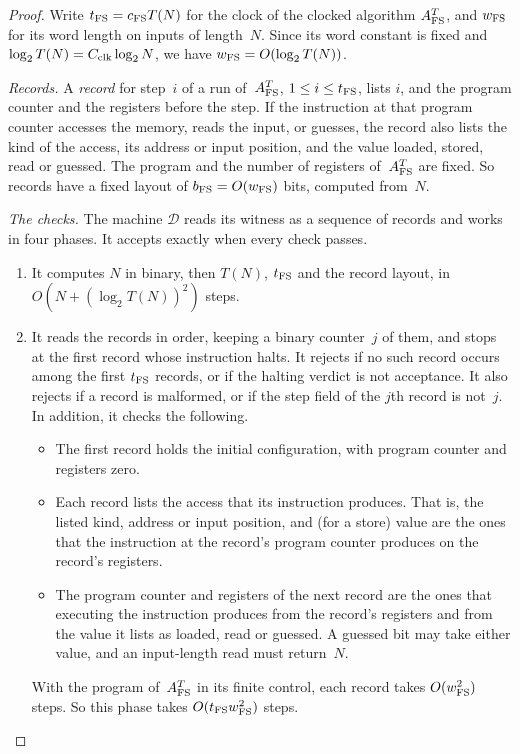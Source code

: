 \documentclass[11pt,letterpaper]{article}
\theoremstyle{definition}
\theoremstyle{remark}
\begin{document}
\begin{proof}
Write $t_{\rm FS}=c_{\rm FS}T(N)$ for the clock of the clocked algorithm
$A^T_{\rm FS}$, and $w_{\rm FS}$ for its word length on inputs of
length~$N$. Since its word constant is fixed and
$\log_2T(N)=C_{\rm clk}\log_2N$, we have $w_{\rm FS}=O(\log_2T(N))$.

\emph{Records.} A \emph{record} for step~$i$ of a run
of~$A^T_{\rm FS}$, $1\le i\le t_{\rm FS}$, lists $i$, and the program
counter and the registers before the step. If the instruction at that
program counter accesses the memory, reads the input, or guesses, the
record also lists the kind of the access, its address or input position,
and the value loaded, stored, read or guessed. The program and the
number of registers of~$A^T_{\rm FS}$ are fixed. So records have a fixed
layout of $b_{\rm FS}=O(w_{\rm FS})$ bits, computed from~$N$.

\emph{The checks.} The machine $\mathcal D$ reads its witness as a
sequence of records and works in four phases. It accepts exactly when
every check passes.
\begin{enumerate}[label=(\arabic*)]
\item It computes $N$ in binary, then $T(N)$, $t_{\rm FS}$ and the
record layout, in $O(N+(\log_2T(N))^2)$ steps.

\item It reads the records in order, keeping a binary counter~$j$ of
them, and stops at the first record whose instruction halts. It
rejects if no such record occurs among the first $t_{\rm FS}$ records,
or if the halting verdict is not acceptance. It also rejects if a
record is malformed, or if the step field of the $j$th record is
not~$j$. In addition, it checks the following.
\begin{itemize}
\item The first record holds the initial configuration, with program
counter and registers zero.

\item Each record lists the access that its instruction produces. That
is, the listed kind, address or input position, and (for a store)
value are the ones that the instruction at the record's program
counter produces on the record's registers.

\item The program counter and registers of the next record are the ones
that executing the instruction produces from the record's registers and
from the value it lists as loaded, read or guessed. A guessed bit may
take either value, and an input-length read must return~$N$.
\end{itemize}
With the program of~$A^T_{\rm FS}$ in its finite control, each record
takes $O(w_{\rm FS}^2)$ steps. So this phase takes
$O(t_{\rm FS}w_{\rm FS}^2)$ steps.


\end{enumerate}
\end{proof}
\end{document}
